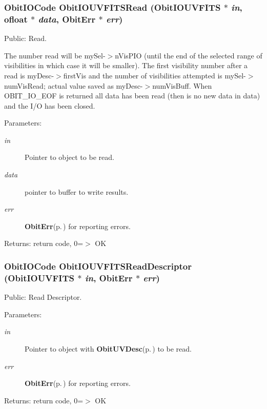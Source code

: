 \subsubsection{\setlength{\rightskip}{0pt plus 5cm}Obit\-IOCode Obit\-IOUVFITSRead ({\bf Obit\-IOUVFITS} $\ast$ {\em in}, {\bf ofloat} $\ast$ {\em data}, {\bf Obit\-Err} $\ast$ {\em err})}\label{ObitIOUVFITS_8c_a27}


Public: Read. 

The number read will be my\-Sel-$>$n\-Vis\-PIO (until the end of the selected range of visibilities in which case it will be smaller). The first visibility number after a read is my\-Desc-$>$first\-Vis and the number of visibilities attempted is my\-Sel-$>$num\-Vis\-Read; actual value saved as my\-Desc-$>$num\-Vis\-Buff. When OBIT\_\-IO\_\-EOF is returned all data has been read (then is no new data in data) and the I/O has been closed. \begin{Desc}
\item[Parameters:]
\begin{description}
\item[{\em in}]Pointer to object to be read. \item[{\em data}]pointer to buffer to write results. \item[{\em err}]{\bf Obit\-Err}{\rm (p.\,\pageref{structObitErr})} for reporting errors. \end{description}
\end{Desc}
\begin{Desc}
\item[Returns:]return code, 0=$>$ OK \end{Desc}
\subsubsection{\setlength{\rightskip}{0pt plus 5cm}Obit\-IOCode Obit\-IOUVFITSRead\-Descriptor ({\bf Obit\-IOUVFITS} $\ast$ {\em in}, {\bf Obit\-Err} $\ast$ {\em err})}\label{ObitIOUVFITS_8c_a34}


Public: Read Descriptor. 

\begin{Desc}
\item[Parameters:]
\begin{description}
\item[{\em in}]Pointer to object with {\bf Obit\-UVDesc}{\rm (p.\,\pageref{structObitUVDesc})} to be read. \item[{\em err}]{\bf Obit\-Err}{\rm (p.\,\pageref{structObitErr})} for reporting errors. \end{description}
\end{Desc}
\begin{Desc}
\item[Returns:]return code, 0=$>$ OK \end{Desc}
